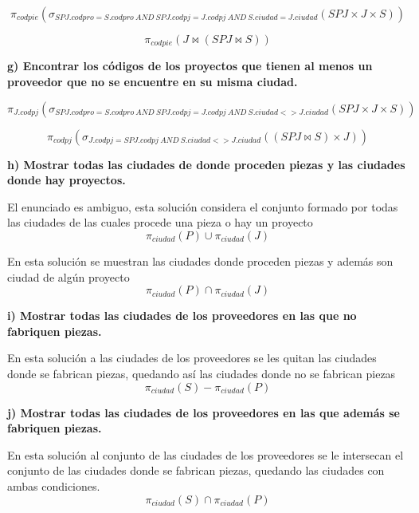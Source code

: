 \documentclass[a4paper,11pt]{article}
\begin{document}
\begin{equation*}
\pi_{codpie}(\sigma_{SPJ.codpro=S.codpro \> AND \> SPJ.codpj=J.codpj \> AND \> S.ciudad=J.ciudad}(SPJ\times J\times S))
\end{equation*}

\begin{equation*}
\pi_{codpie}(J \Join (SPJ \Join S))
\end{equation*}

\textbf{g) Encontrar los códigos de los proyectos que tienen al menos un proveedor que
no se encuentre en su misma ciudad.}

\begin{equation*}
\pi_{J.codpj}(\sigma_{SPJ.codpro=S.codpro \> AND \> SPJ.codpj=J.codpj \> AND \> S.ciudad<>J.ciudad}(SPJ\times J\times S))
\end{equation*}

\begin{equation*}
\pi_{codpj}(\sigma_{J.codpj=SPJ.codpj \> AND \> S.ciudad<>J.ciudad}((SPJ \Join S)\times J))
\end{equation*}

\textbf{h) Mostrar todas las ciudades de donde proceden piezas y las ciudades donde hay
proyectos.}

El enunciado es ambiguo, esta solución considera el conjunto formado por todas las ciudades de las cuales procede una pieza o hay un proyecto
\begin{equation*}
\pi_{ciudad}(P)\cup\pi_{ciudad}(J)
\end{equation*}

En esta solución se muestran las ciudades donde proceden piezas y además son ciudad de algún proyecto
\begin{equation*}
\pi_{ciudad}(P)\cap\pi_{ciudad}(J)
\end{equation*}

\textbf{i) Mostrar todas las ciudades de los proveedores en las que no fabriquen piezas.}

En esta solución a las ciudades de los proveedores se les quitan las ciudades donde se fabrican piezas, quedando así las ciudades donde no se fabrican piezas
\begin{equation*}
\pi_{ciudad}(S)-\pi_{ciudad}(P)
\end{equation*}

\textbf{j) Mostrar todas las ciudades de los proveedores en las que además se fabriquen
piezas.}

En esta solución al conjunto de las ciudades de los proveedores se le intersecan el conjunto de las ciudades donde se fabrican piezas, quedando las ciudades con ambas condiciones.
\begin{equation*}
\pi_{ciudad}(S)\cap\pi_{ciudad}(P)
\end{equation*}
\end{document}
